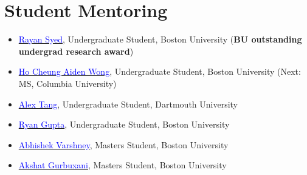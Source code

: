 \section{Student Mentoring}
\begin{itemize}[itemsep=0pt, parsep=0pt]
    \item \href{https://www.linkedin.com/in/rayan-syed-507379296/}{\textcolor{blue}{Rayan Syed}}, Undergraduate Student, Boston University (\textbf{BU outstanding undergrad research award})
    \item \href{https://www.linkedin.com/in/aiden-wong-68962a22a/}{\textcolor{blue}{Ho Cheung Aiden Wong}}, Undergraduate Student, Boston University (Next: MS, Columbia University)
    \item \href{https://www.linkedin.com/in/alexztang/}{\textcolor{blue}{Alex Tang}}, Undergraduate Student, Dartmouth University
    \item \href{https://www.linkedin.com/in/ryan-gupta-a451b0262//}{\textcolor{blue}{Ryan Gupta}}, Undergraduate Student, Boston University 
    \item \href{https://www.linkedin.com/in/abhishek-varshney-a75748159/}{\textcolor{blue}{Abhishek Varshney}}, Masters Student, Boston University
    \item \href{https://www.linkedin.com/in/akshatgurbuxani/}{\textcolor{blue}{Akshat Gurbuxani}}, Masters Student, Boston University
\end{itemize}